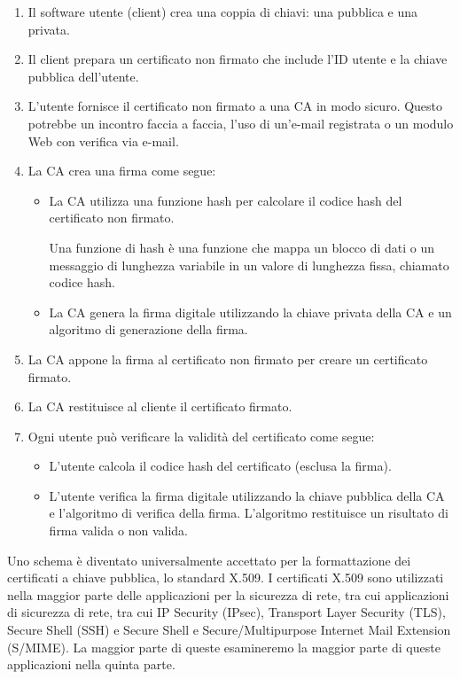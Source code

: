 \begin{enumerate}
    \item Il software utente (client) crea una coppia di chiavi: una pubblica e una privata.
    
    \item Il client prepara un certificato non firmato che include l'ID utente e la chiave pubblica dell'utente.
    
    \item L'utente fornisce il certificato non firmato a una CA in modo sicuro. Questo potrebbe un incontro faccia a faccia, l'uso di un'e-mail registrata o un modulo Web con verifica via e-mail.
    
    \item La CA crea una firma come segue:
        
        \begin{itemize}
            \item La CA utilizza una funzione hash per calcolare il codice hash del certificato non firmato.
            
            Una funzione di hash è una funzione che mappa un blocco di dati o un messaggio di lunghezza variabile in un valore di lunghezza fissa, chiamato codice hash.
            
            \item La CA genera la firma digitale utilizzando la chiave privata della CA e un algoritmo di generazione della firma.
            
        \end{itemize}
    
    \item La CA appone la firma al certificato non firmato per creare un certificato firmato.
    
    \item La CA restituisce al cliente il certificato firmato.
    
    \item Ogni utente può verificare la validità del certificato come segue:
        
        \begin{itemize}
            \item L'utente calcola il codice hash del certificato (esclusa la firma).
            
            \item L'utente verifica la firma digitale utilizzando la chiave pubblica della CA e l'algoritmo di verifica della firma. L'algoritmo restituisce un risultato di firma valida o non valida.
        \end{itemize}

\end{enumerate}
Uno schema è diventato universalmente accettato per la formattazione dei certificati a chiave pubblica, lo standard X.509. I certificati X.509 sono utilizzati nella maggior parte delle applicazioni per la sicurezza di rete, tra cui applicazioni di sicurezza di rete, tra cui IP Security (IPsec), Transport Layer Security (TLS), Secure Shell (SSH) e Secure Shell e Secure/Multipurpose Internet Mail Extension (S/MIME). La maggior parte di queste esamineremo la maggior parte di queste applicazioni nella quinta parte.

